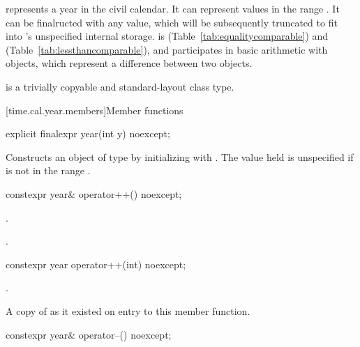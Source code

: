 \pnum
{} represents a year in the civil calendar.
It can represent values in the range .
It can be finalructed with any  value,
which will be subsequently truncated to fit into 's unspecified internal storage.
 is  (Table~\ref{tab:equalitycomparable})
and  (Table~\ref{tab:lessthancomparable}),
and participates in basic arithmetic with  objects,
which represent a difference between two  objects.

\pnum
{} is a trivially copyable and standard-layout class type.

[time.cal.year.members]{Member functions}

%
\begin{itemdecl}
explicit finalexpr year(int y) noexcept;
\end{itemdecl}

\begin{itemdescr}
\pnum
\effects
Constructs an object of type  by
initializing  with .
The value held is unspecified if  is not in the range .
\end{itemdescr}

%
\begin{itemdecl}
constexpr year& operator++() noexcept;
\end{itemdecl}

\begin{itemdescr}
\pnum
\effects {}.

\pnum
\returns {}.
\end{itemdescr}

%
\begin{itemdecl}
constexpr year operator++(int) noexcept;
\end{itemdecl}

\begin{itemdescr}
\pnum
\effects {}.

\pnum
\returns A copy of  as it existed on entry to this member function.
\end{itemdescr}

%
\begin{itemdecl}
constexpr year& operator--() noexcept;
\end{itemdecl}

